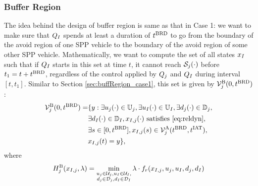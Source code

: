 \subsubsection{Buffer Region} \label{sec:buffRegion_case2}
The idea behind the design of buffer region is same as that in Case 1: we want to make sure that $Q_{I}$ spends at least a duration of $t^\text{BRD}$ to go from the boundary of the avoid region of one SPP vehicle to the boundary of the avoid region of some other SPP vehicle. Mathematically, we want to compute the set of all states $x_{I}$ such that if $Q_{I}$ starts in this set at time $t$, it cannot reach $\mathcal{S}_j(\cdot)$ before $t_1 = t + t^\text{BRD}$, regardless of the control applied by $Q_j$ and $Q_{I}$ during interval $[t, t_1]$. Similar to Section \ref{sec:buffRegion_case1}, this set is given by $\mathcal{V}^{\text{B}}_{j}(0, t^\text{BRD})$: 
\begin{equation} \label{eqn:buffBRS_case1}
\begin{aligned}
\brs^{\text{B}}_{j}(0, \brd) = & \{y: \exists \ctrl_j(\cdot) \in \cfset_j, \exists \ctrl_\intr(\cdot) \in \cfset_\intr, \exists \dstb_j(\cdot) \in \dfset_j, \\
& \exists \dstb_\intr(\cdot) \in \dfset_\intr, \state_{\intr, j}(\cdot) \text{ satisfies \eqref{eq:reldyn}},\\
& \exists s \in [0, \brd], \state_{\intr, j}(s) \in \brs^{\text{A}}_{j}(\brd, \iat),\\
& \state_{\intr, j}(t) = y\},
\end{aligned}
\end{equation}
where 
\begin{equation}
H^{\text{B}}_{j}(x_{I, j}, \lambda) = \min_{\substack{u_j \in \mathcal{U}_j, u_I \in \mathcal{U}_I, \\ d_j \in \mathcal{D}_j, d_I \in \mathcal{D}_I}} \lambda \cdot f_r(x_{I, j}, u_j, u_I, d_j, d_I)
\end{equation}

